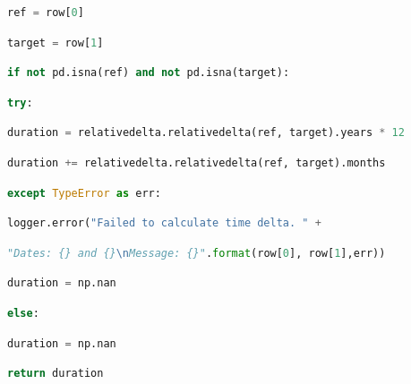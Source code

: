 \documentclass[
  11pt,
  a4paper,
  DIV=12,captions=tableheading,oneside]{scrbook}
\begin{document}
\begin{lstlisting}[language=Python,stepnumber=2,basicstyle=\footnotesize]
        ref = row[0]\end{lstlisting}
\begin{lstlisting}[language=Python,stepnumber=2,basicstyle=\footnotesize]
        target = row[1]\end{lstlisting}
\begin{lstlisting}[language=Python,stepnumber=2,basicstyle=\footnotesize]
        if not pd.isna(ref) and not pd.isna(target):\end{lstlisting}
\begin{lstlisting}[language=Python,stepnumber=2,basicstyle=\footnotesize]
            try:\end{lstlisting}
\begin{lstlisting}[language=Python,stepnumber=2,basicstyle=\footnotesize]
                duration = relativedelta.relativedelta(ref, target).years * 12\end{lstlisting}
\begin{lstlisting}[language=Python,stepnumber=2,basicstyle=\footnotesize]
                duration += relativedelta.relativedelta(ref, target).months\end{lstlisting}
\begin{lstlisting}[language=Python,stepnumber=2,basicstyle=\footnotesize]
            except TypeError as err:\end{lstlisting}
\begin{lstlisting}[language=Python,stepnumber=2,basicstyle=\footnotesize]
                logger.error("Failed to calculate time delta. " +\end{lstlisting}
\begin{lstlisting}[language=Python,stepnumber=2,basicstyle=\footnotesize]
                                "Dates: {} and {}\nMessage: {}".format(row[0], row[1],err))\end{lstlisting}
\begin{lstlisting}[language=Python,stepnumber=2,basicstyle=\footnotesize]
                duration = np.nan\end{lstlisting}
\begin{lstlisting}[language=Python,stepnumber=2,basicstyle=\footnotesize]
        else:\end{lstlisting}
\begin{lstlisting}[language=Python,stepnumber=2,basicstyle=\footnotesize]
            duration = np.nan\end{lstlisting}
\begin{lstlisting}[language=Python,stepnumber=2,basicstyle=\footnotesize]
        return duration\end{lstlisting}
\end{document}
